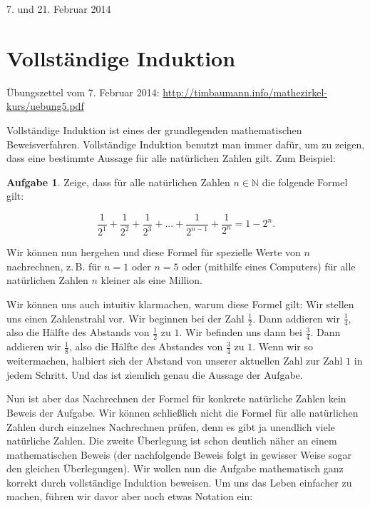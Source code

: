 \documentclass[a4paper,ngerman,12pt]{scrartcl}
\newcommand{\N}{\mathbb{N}}
\newcommand{\datum}[1]{\hfill {#1}\\}
\theoremstyle{definition}
\newtheorem*{aufg}{Aufgabe}
\begin{document}

\datum{7. und 21. Februar 2014}

\section{Vollständige Induktion}

Übungszettel vom 7. Februar 2014: \mbox{\url{http://timbaumann.info/mathezirkel-kurs/uebung5.pdf}}

Vollständige Induktion ist eines der grundlegenden mathematischen Beweisverfahren. Vollständige Induktion benutzt man immer dafür, um zu zeigen, dass eine bestimmte Aussage für alle natürlichen Zahlen gilt. Zum Beispiel:

\begin{aufg}
  Zeige, dass für alle natürlichen Zahlen $n \in \N$ die folgende Formel gilt:

  \[ \frac{1}{2^1} + \frac{1}{2^2} + \frac{1}{2^3} + ... + \frac{1}{2^{n-1}} + \frac{1}{2^n} = 1 - 2^n. \]
\end{aufg}

Wir können nun hergehen und diese Formel für spezielle Werte von $n$ nachrechnen, z.\,B. für $n=1$ oder $n=5$ oder (mithilfe eines Computers) für alle natürlichen Zahlen $n$ kleiner als eine Million.

Wir können uns auch intuitiv klarmachen, warum diese Formel gilt: Wir stellen uns einen Zahlenstrahl vor. Wir beginnen bei der Zahl $\frac{1}{2}$. Dann addieren wir $\frac{1}{4}$, also die Hälfte des Abstands von $\frac{1}{2}$ zu $1$. Wir befinden uns dann bei $\frac{3}{4}$. Dann addieren wir $\frac{1}{8}$, also die Hälfte des Abstandes von $\frac{3}{4}$ zu $1$. Wenn wir so weitermachen, halbiert sich der Abstand von unserer aktuellen Zahl zur Zahl $1$ in jedem Schritt. Und das ist ziemlich genau die Aussage der Aufgabe.

Nun ist aber das Nachrechnen der Formel für konkrete natürliche Zahlen kein Beweis der Aufgabe. Wir können schließlich nicht die Formel für alle natürlichen Zahlen durch einzelnes Nachrechnen prüfen, denn es gibt ja unendlich viele natürliche Zahlen. Die zweite Überlegung ist schon deutlich näher an einem mathematischen Beweis (der nachfolgende Beweis folgt in gewisser Weise sogar den gleichen Überlegungen). Wir wollen nun die Aufgabe mathematisch ganz korrekt durch vollständige Induktion beweisen. Um uns das Leben einfacher zu machen, führen wir davor aber noch etwas Notation ein:
\end{document}
